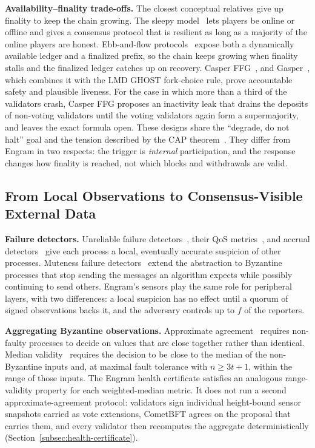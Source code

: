 \textbf{Availability--finality trade-offs.}
The closest conceptual relatives give up finality to keep the chain growing.
The sleepy model~\cite{pass2017sleepy} lets players be online or offline and
gives a consensus protocol that is resilient as long as a majority of the online
players are honest.
Ebb-and-flow protocols~\cite{neu2021ebbflow} expose both a dynamically
available ledger and a finalized prefix, so the chain keeps growing when
finality stalls and the finalized ledger catches up on recovery. Casper
FFG~\cite{buterin2017casper}, and Gasper~\cite{buterin2020gasper}, which
combines it with the LMD GHOST fork-choice rule, prove accountable safety and
plausible liveness. For the case in which more than a third of the validators
crash, Casper FFG proposes an inactivity leak that drains the deposits of
non-voting validators until the voting validators again form a supermajority,
and leaves the exact formula open. These designs share the
``degrade, do not halt'' goal and the tension described by the CAP
theorem~\cite{gilbert2002cap}. They differ from Engram in two respects: the
trigger is \emph{internal} participation, and the response changes how finality
is reached, not which blocks and withdrawals are valid.

\subsection{From Local Observations to Consensus-Visible External Data}
\label{subsec:rw-detect}
\textbf{Failure detectors.}
Unreliable failure detectors~\cite{chandra1996unreliable}, their QoS
metrics~\cite{chen2002qos}, and accrual detectors~\cite{hayashibara2004phi}
give each process a local, eventually accurate suspicion of other processes.
Muteness failure detectors~\cite{doudou1999muteness} extend the abstraction to
Byzantine processes that stop sending the messages an algorithm expects while
possibly continuing to send others. Engram's
sensors play the same role for peripheral layers, with two differences:
a local suspicion has no effect until a quorum of signed observations backs it, and the adversary
controls up to $f$ of the reporters.

\textbf{Aggregating Byzantine observations.}
Approximate agreement~\cite{dolev1986approximate} requires non-faulty
processes to decide on values that are close together rather than identical.
Median validity~\cite{stolz2015median} requires the decision to be close to the
median of the non-Byzantine inputs and, at maximal fault tolerance with
$n \geq 3t+1$, within the range of those inputs. The Engram health
certificate satisfies an analogous range-validity property for each
weighted-median metric. It does not run a second approximate-agreement
protocol: validators sign individual height-bound sensor snapshots carried as
vote extensions, CometBFT agrees on the proposal that carries them, and every
validator then recomputes the aggregate deterministically
(Section~\ref{subsec:health-certificate}).

